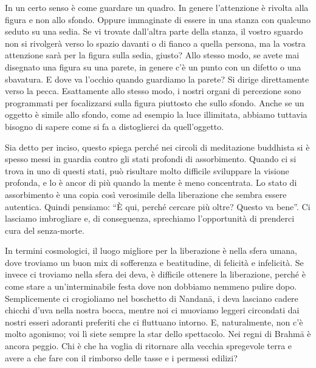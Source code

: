 In un certo senso è come guardare un quadro. In genere l'attenzione è rivolta alla figura e non allo sfondo. Oppure immaginate di essere in una stanza con qualcuno seduto su una sedia. Se vi trovate dall'altra parte della stanza, il vostro sguardo non si rivolgerà verso lo spazio davanti o di fianco a quella persona, ma la vostra attenzione sarà per la figura sulla sedia, giusto? Allo stesso modo, se avete mai disegnato una figura su una parete, in genere c'è un punto con un difetto o una sbavatura. E dove va l'occhio quando guardiamo la parete? Si dirige direttamente verso la pecca. Esattamente allo stesso modo, i nostri organi di percezione sono programmati per focalizzarsi sulla figura piuttosto che sullo sfondo. Anche se un oggetto è simile allo sfondo, come ad esempio la luce illimitata, abbiamo tuttavia bisogno di sapere come si fa a distoglierci da quell'oggetto.

Sia detto per inciso, questo spiega perché nei circoli di meditazione buddhista si è spesso messi in guardia contro gli stati profondi di assorbimento. Quando ci si trova in uno di questi stati, può risultare molto difficile sviluppare la visione profonda, e lo è ancor di più quando la mente è meno concentrata. Lo stato di assorbimento è una copia così verosimile della liberazione che sembra essere autentica. Quindi pensiamo: ``È qui, perché cercare più oltre? Questo va bene''. Ci lasciamo imbrogliare e, di conseguenza, sprechiamo l'opportunità di prenderci cura del senza-morte.

In termini cosmologici, il luogo migliore per la liberazione è nella sfera umana, dove troviamo un buon mix di sofferenza e beatitudine, di felicità e infelicità. Se invece ci troviamo nella sfera dei deva, è difficile ottenere la liberazione, perché è come stare a un'interminabile festa dove non dobbiamo nemmeno pulire dopo. Semplicemente ci crogioliamo nel boschetto di Nandanā, i deva lasciano cadere chicchi d'uva nella nostra bocca, mentre noi ci muoviamo leggeri circondati dai nostri esseri adoranti preferiti che ci fluttuano intorno. E, naturalmente, non c'è molto agonismo; voi lì siete sempre la star dello spettacolo. Nei regni di Brahmā è ancora peggio. Chi è che ha voglia di ritornare alla vecchia spregevole terra e avere a che fare con il rimborso delle tasse e i permessi edilizi?

